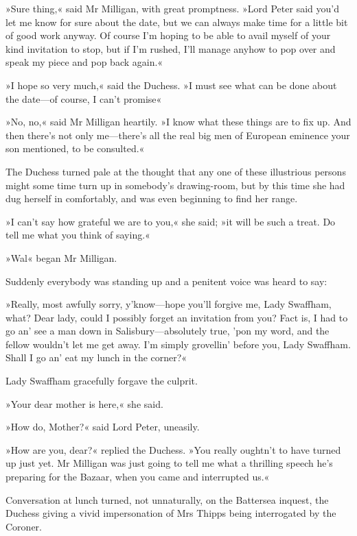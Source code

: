 »Sure thing,« said Mr Milligan, with great promptness. »Lord Peter said you'd let me know for sure about the date, but we can always make time for a little bit of good work anyway. Of course I'm hoping to be able to avail myself of your kind invitation to stop, but if I'm rushed, I'll manage anyhow to pop over and speak my piece and pop back again.«

»I hope so very much,« said the Duchess. »I must see what can be done about the date\allowbreak---\allowbreak of course, I can't promise\longdash«

»No, no,« said Mr Milligan heartily. »I know what these things are to fix up. And then there's not only me\allowbreak---\allowbreak there's all the real big men of European eminence your son mentioned, to be consulted.«

The Duchess turned pale at the thought that any one of these illustrious persons might some time turn up in somebody's drawing-room, but by this time she had dug herself in comfortably, and was even beginning to find her range.

»I can't say how grateful we are to you,« she said; »it will be such a treat. Do tell me what you think of saying.«

»Wal\longdash« began Mr Milligan.

Suddenly everybody was standing up and a penitent voice was heard to say:

»Really, most awfully sorry, y'know\allowbreak---\allowbreak hope you'll forgive me, Lady Swaffham, what? Dear lady, could I possibly forget an invitation from you? Fact is, I had to go an' see a man down in Salisbury\allowbreak---\allowbreak absolutely true, 'pon my word, and the fellow wouldn't let me get away. I'm simply grovellin' before you, Lady Swaffham. Shall I go an' eat my lunch in the corner?«

Lady Swaffham gracefully forgave the culprit.

»Your dear mother is here,« she said.

»How do, Mother?« said Lord Peter, uneasily.

»How are you, dear?« replied the Duchess. »You really oughtn't to have turned up just yet. Mr Milligan was just going to tell me what a thrilling speech he's preparing for the Bazaar, when you came and interrupted us.«

Conversation at lunch turned, not unnaturally, on the Battersea inquest, the Duchess giving a vivid impersonation of Mrs Thipps being interrogated by the Coroner.

